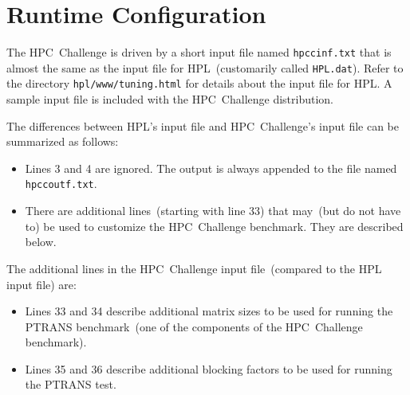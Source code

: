 \documentclass[twocolumn]{article}
\begin{document}
\section{Runtime Configuration}
The HPC~Challenge is driven by a short input file named
\texttt{hpccinf.txt} that is almost the same as the input file for
HPL~(customarily called \texttt{HPL.dat}). Refer to the directory
\texttt{hpl/www/tuning.html} for details about the input file for
HPL. A sample input file is included with the HPC~Challenge
distribution.

The differences between HPL's input file and HPC~Challenge's input
file can be summarized as follows:

\begin{itemize}
\item Lines 3 and 4 are ignored. The output is always appended to the
file named \texttt{hpccoutf.txt}.
\item There are additional lines~(starting with line 33) that may~(but
do not have to) be used to customize the HPC~Challenge benchmark. They
are described below.
\end{itemize}

The additional lines in the HPC~Challenge input file~(compared to the
HPL input file) are:

\begin{itemize}
\item Lines 33 and 34 describe additional matrix sizes to be used for
running the PTRANS benchmark~(one of the components of the
HPC~Challenge benchmark).
\item Lines 35 and 36 describe additional blocking factors to be used
for running the PTRANS test.
\end{itemize}
\end{document}

